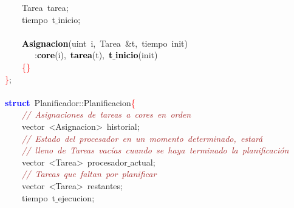 \mbox{}\ \ \ \ \textcolor{TealBlue}{Tarea}\ tarea\textcolor{BrickRed}{;} \\
\mbox{}\ \ \ \ \textcolor{TealBlue}{tiempo}\ t$\_$inicio\textcolor{BrickRed}{;} \\
\mbox{} \\
\mbox{}\ \ \ \ \textbf{\textcolor{Black}{Asignacion}}\textcolor{BrickRed}{(}\textcolor{TealBlue}{uint}\ i\textcolor{BrickRed}{,}\ \textcolor{TealBlue}{Tarea}\ \textcolor{BrickRed}{\&}t\textcolor{BrickRed}{,}\ \textcolor{TealBlue}{tiempo}\ init\textcolor{BrickRed}{)} \\
\mbox{}\ \ \ \ \ \ \ \textcolor{BrickRed}{:}\textbf{\textcolor{Black}{core}}\textcolor{BrickRed}{(}i\textcolor{BrickRed}{),}\ \textbf{\textcolor{Black}{tarea}}\textcolor{BrickRed}{(}t\textcolor{BrickRed}{),}\ \textbf{\textcolor{Black}{t$\_$inicio}}\textcolor{BrickRed}{(}init\textcolor{BrickRed}{)} \\
\mbox{}\ \ \ \ \textcolor{Red}{\{\}} \\
\mbox{}\textcolor{Red}{\}}\textcolor{BrickRed}{;} \\
\mbox{} \\
\mbox{}\textbf{\textcolor{Blue}{struct}}\ \textcolor{TealBlue}{Planificador}\textcolor{BrickRed}{::}Planificacion\textcolor{Red}{\{} \\
\mbox{}\ \ \ \ \textit{\textcolor{Brown}{//\ Asignaciones\ de\ tareas\ a\ cores\ en\ orden}} \\
\mbox{}\ \ \ \ vector\ \textcolor{BrickRed}{\textless{}}Asignacion\textcolor{BrickRed}{\textgreater{}}\ historial\textcolor{BrickRed}{;} \\
\mbox{}\ \ \ \ \textit{\textcolor{Brown}{//\ Estado\ del\ procesador\ en\ un\ momento\ determinado,\ estará}} \\
\mbox{}\ \ \ \ \textit{\textcolor{Brown}{//\ lleno\ de\ Tareas\ vacías\ cuando\ se\ haya\ terminado\ la\ planificación}} \\
\mbox{}\ \ \ \ vector\ \textcolor{BrickRed}{\textless{}}Tarea\textcolor{BrickRed}{\textgreater{}}\ procesador$\_$actual\textcolor{BrickRed}{;} \\
\mbox{}\ \ \ \ \textit{\textcolor{Brown}{//\ Tareas\ que\ faltan\ por\ planificar}} \\
\mbox{}\ \ \ \ vector\ \textcolor{BrickRed}{\textless{}}Tarea\textcolor{BrickRed}{\textgreater{}}\ restantes\textcolor{BrickRed}{;} \\
\mbox{}\ \ \ \ \textcolor{TealBlue}{tiempo}\ t$\_$ejecucion\textcolor{BrickRed}{;} \\
\mbox{} \\
